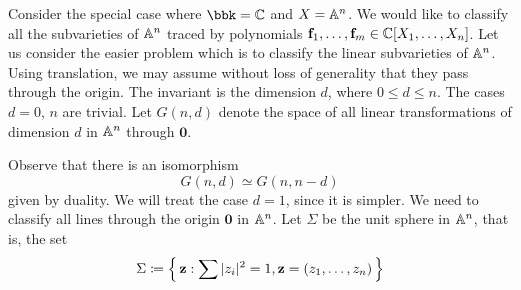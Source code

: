 Consider the special case where $\bbk=\bbC$ and $X=\mathbb{A}^n$. We would like
to classify all the subvarieties of $\mathbb{A}^n$ traced by polynomials
$\mathbf{f}_1,\dotsc,\mathbf{f}_m\in\mathbb{C}[X_1,\dotsc,X_n]$. Let us consider the easier
problem which is to classify the linear subvarieties of $\mathbb{A}^n$. Using
translation, we may assume without loss of generality that they pass
through the origin. The invariant is the dimension $d$, where $0\leq d\leq
n$. The cases $d=0$, $n$ are trivial. Let $G(n,d)$ denote the space of all
linear transformations of dimension $d$ in $\mathbb{A}^n$ through $\mathbf{0}$.

Observe that there is an isomorphism
\[
G(n,d)\simeq G(n,n-d)
\]
given by duality. We will treat the case $d=1$, since it is simpler. We
need to classify all lines through the origin $\mathbf{0}$ in $\mathbb{A}^n$. Let
$\Sigma$ be the unit sphere in $\mathbb{A}^n$, that is, the set
\[
  \Sigma\coloneq\left\{\,\mathbf{z}:\sum|z_i|^2=1,\mathbf{z}=(z_1,\dotsc,z_n)\,\right\}
\]

